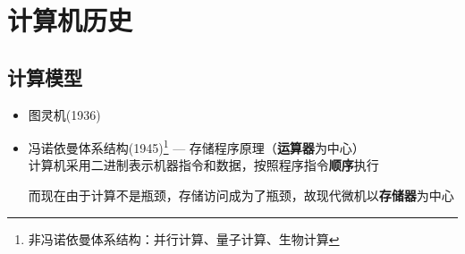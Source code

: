 
\section{计算机历史}
\subsection{计算模型}
\begin{itemize}
	\item 图灵机(1936)
	\item 冯诺依曼体系结构(1945)\footnote{非冯诺依曼体系结构：并行计算、量子计算、生物计算} --- 存储程序原理（\textbf{运算器}为中心）\\
	计算机采用二进制表示机器指令和数据，按照程序指令\textbf{顺序}执行
\begin{center}
\end{center}
而现在由于计算不是瓶颈，存储访问成为了瓶颈，故现代微机以\textbf{存储器}为中心
\begin{center}
\end{center}
\end{itemize}

